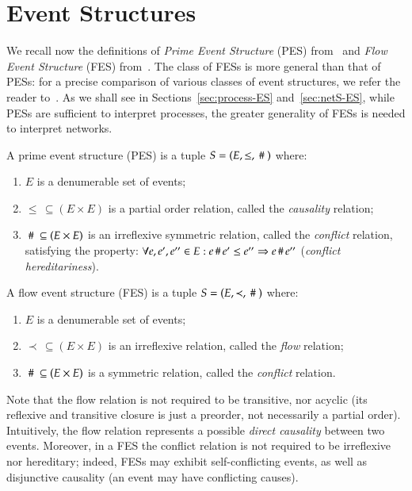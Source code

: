 
\section{Event Structures}\label{sec:eventStr}



We recall now the definitions of \emph{Prime Event Structure} (PES)
from~\cite{Win80,NPW81} and \emph{Flow Event Structure} (FES)
from~\cite{BC88a}. The class of FESs is more general than that of
PESs: for a precise comparison of various classes of event structures,
we refer the reader to~\cite{BC91}. As we shall see in
Sections~\ref{sec:process-ES} and~\ref{sec:netS-ES}, while PESs are sufficient to interpret
processes, the  greater  generality of FESs is needed to interpret networks.
%
\begin{definition}  A prime event structure {\rm (PES)} is a
    tuple 
$S=(E,\leq, ~\#~)$ where:
\begin{enumerate}
\item {} $E$ is a denumerable set of events;
\item {}    $\leq\,\subseteq (E\times E)$ is a partial order relation,
called the \emph{causality} relation;
\item {}  $~\#~\subseteq (E\times E)$ is an irreflexive symmetric relation, called the
\emph{conflict} relation, satisfying the property: $\forall e, e', e''\in E: e \,\#\, e'\leq
e''\Rightarrow e \,\#\, e''$ (\emph{conflict hereditariness}).
\end{enumerate}
\end{definition}



\begin{definition} A flow event structure {\rm (FES)}
    is a  tuple $S=(E,\prec,~\#~)$ where:
    \begin{enumerate}
\item{} $E$ is a denumerable set of events;
\item{} $\prec\,\subseteq (E\times E)$ is an irreflexive relation,
called the \emph{flow} relation;
\item{} $~\#~\subseteq (E\times E)$ is a symmetric relation, called the
\emph{conflict} relation.
\end{enumerate}
\end{definition}
%
Note that the flow relation is not required to be transitive, nor
acyclic (its reflexive and transitive closure is just a preorder, not
necessarily a partial order).  Intuitively, the flow relation
represents a possible {\sl direct causality} between two events.
 Moreover,  in a FES the conflict relation is not required to be
irreflexive nor hereditary; indeed, FESs may exhibit self-conflicting
events, as well as disjunctive causality (an event may have
conflicting causes).





